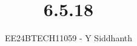 \documentclass[journal]{IEEEtran}
\begin{document}
	
	
	\vspace{3cm}
	
	\title{6.5.18}
	\author{EE24BTECH11059 - Y Siddhanth}
	{\let\newpage\relax\maketitle}
	
	\renewcommand{\thefigure}{\theenumi}
	\renewcommand{\thetable}{\theenumi}
	\setlength{\intextsep}{10pt} %
	
	
	\renewcommand{\thetable}{\theenumi}
	
\end{document}
